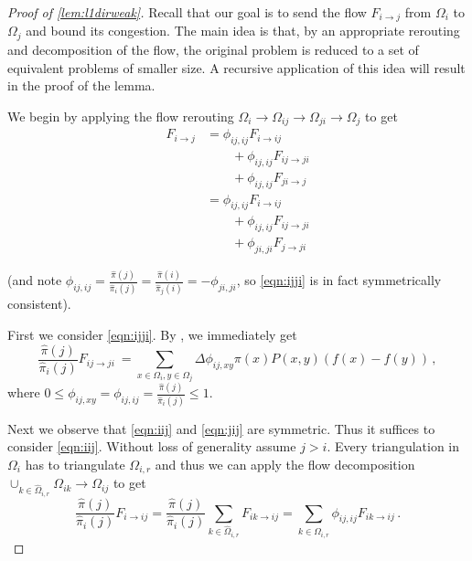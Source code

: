 \documentclass[a4paper, 12p]{article}
\numberwithin{equation}{section}
\newcommand{\Omorproj}{\hat{\Omega}}
\newcommand{\piorproj}{\hat{\pi}}
\newcommand{\flo}[2]{F_{#1 \rightarrow #2}}
\newcommand{\rar}{\rightarrow}
\newcommand{\Om}{\Omega}
\begin{document}
\begin{proof}[Proof of \cref{lem:l1dirweak}]
    Recall that our goal is to send the flow $\flo{i}{j}$ from $\Omega_i$ to $\Omega_j$ and bound its congestion. The main idea is that, by an appropriate rerouting and decomposition of the flow, the original problem is reduced to a set of equivalent problems of smaller size. A recursive application of this idea will result in the proof of the lemma.

    We begin by applying the flow rerouting $\Om_i\rar\Om_{ij}\rar\Om_{ji}\rar\Om_{j}$ to get
    \begin{align}
        \flo{i}{j} &= 
                \phi_{ij,ij}\flo{i}{ij} \nonumber \\
        &\qquad + \phi_{ij,ij}\flo{ij}{ji} \nonumber \\
        &\qquad + \phi_{ij,ij}\flo{ji}{j}  \nonumber \\
       &= \phi_{ij,ij}\flo{i}{ij} \label{eqn:iij} \\
        &\qquad + \phi_{ij,ij}\flo{ij}{ji} \label{eqn:ijji}  \\
        &\qquad + \phi_{ji,ji}\flo{j}{ji} \label{eqn:jij} 
    \end{align}

    (and note $\phi_{ij,ij} = \frac{\piorproj(j)}{\piorproj_i(j)} = \frac{\piorproj(i)}{\piorproj_j(i)} = -\phi_{ji,ji}$, so \eqref{eqn:ijji} is in fact symmetrically consistent).

    First we consider \eqref{eqn:ijji}. By , we immediately get
    \begin{equation}\label{eqn:ijjidir}
        \frac{\piorproj(j)}{\piorproj_i(j)}\flo{ij}{ji}\ = \sum_{x\in\Om_i, y \in \Om_j}\Delta\phi_{ij,xy}\pi(x)P(x, y)\left(f(x) - f(y)\right)\,,
    \end{equation}
    where $0 \leq \phi_{ij,xy} = \phi_{ij,ij} = \frac{\piorproj(j)}{\piorproj_i(j)} \leq 1.$    

    Next we observe that \eqref{eqn:iij} and \eqref{eqn:jij} are symmetric. Thus it suffices to consider \eqref{eqn:iij}. Without loss of generality assume $j > i$. Every triangulation in $\Omega_i$ has to triangulate $\Omega_{i,r}$ and thus we can apply the flow decomposition $\cup_{k\in\Omorproj_{i,r}}\Om_{ik}\rar \Om_{ij}$ to get
    \begin{equation} \label{eqn:ikij}
        \frac{\piorproj(j)}{\piorproj_i(j)}\flo{i}{ij}=\frac{\piorproj(j)}{\piorproj_i(j)}\sum_{k\in\Omorproj_{i,r}}\flo{ik}{ij} = \sum_{k \in \Omorproj_{i,r}} \phi_{ij,ij}\flo{ik}{ij}\,.
    \end{equation}
    

\end{proof}
\end{document}
